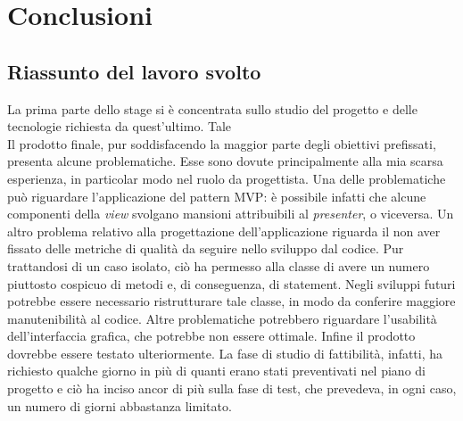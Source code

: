 \documentclass[../Tesi.tex]{subfiles}
\begin{document}
\section{Conclusioni}
	\subsection{Riassunto del lavoro svolto}
	La prima parte dello stage si è concentrata sullo studio del progetto e delle tecnologie richiesta da quest'ultimo. Tale 
	\\Il prodotto finale, pur soddisfacendo la maggior parte degli obiettivi prefissati, presenta alcune problematiche. Esse sono dovute principalmente alla mia scarsa esperienza, in particolar modo nel ruolo da progettista. Una delle problematiche può riguardare l'applicazione del pattern MVP: è possibile infatti che alcune componenti della \textit{view} svolgano mansioni attribuibili al \textit{presenter}, o viceversa. Un altro problema relativo alla progettazione dell'applicazione riguarda il non aver fissato delle metriche di qualità da seguire nello sviluppo dal codice. Pur trattandosi di un caso isolato, ciò ha permesso alla classe  di avere un numero piuttosto cospicuo di metodi e, di conseguenza, di statement. Negli sviluppi futuri potrebbe essere necessario ristrutturare tale classe, in modo da conferire maggiore manutenibilità al codice. Altre problematiche potrebbero riguardare l'usabilità dell'interfaccia grafica, che potrebbe non essere ottimale. Infine il prodotto dovrebbe essere testato ulteriormente. La fase di studio di fattibilità, infatti, ha richiesto qualche giorno in più di quanti erano stati preventivati nel piano di progetto e ciò ha inciso ancor di più sulla fase di test, che prevedeva, in ogni caso, un numero di giorni abbastanza limitato.
\end{document}
